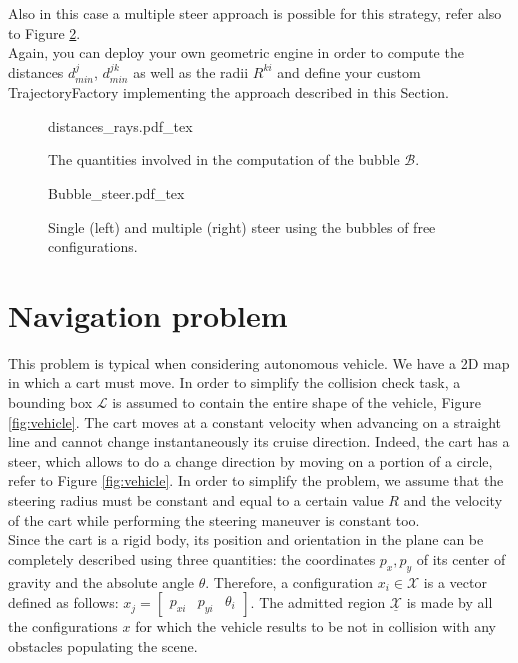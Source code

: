 Also in this case a multiple steer approach is possible for this strategy, refer also to Figure \ref{fig:bubbles}.
\\
Again, you can deploy your own geometric engine in order to compute the distances $d^j_{min}$, $d^{jk}_{min}$ as well as the radii $R^{ki}$ and define your custom TrajectoryFactory implementing the approach described in this Section.

 \begin{figure}
	 \centering
 \def\svgwidth{0.85 \columnwidth}
 {distances_rays.pdf_tex} 
	 \caption{The quantities involved in the computation of the bubble $\mathcal{B}$.}
 \label{fig:dist_ray}
 \end{figure}

 \begin{figure}
	 \centering
 \def\svgwidth{0.45 \columnwidth}
 {Bubble_steer.pdf_tex} 
	 \caption{Single (left) and multiple (right) steer using the bubbles of free configurations.}
 \label{fig:bubbles}
 \end{figure}

\section{Navigation problem}

This problem is typical when considering autonomous vehicle. We have a 2D map in which a cart must move. In order to simplify the collision check task, a bounding box $\mathcal{L}$ is assumed to contain the entire shape of the vehicle, Figure \ref{fig:vehicle}. The cart moves at a constant velocity when advancing on a straight line and cannot change instantaneously its cruise direction. Indeed, the cart has a steer, which allows to do a change direction by moving on a portion of a circle, refer to Figure \ref{fig:vehicle}. In order to simplify the problem, we assume that the steering radius must be constant and equal to a certain value $R$ and the velocity of the cart while performing the steering maneuver is constant too. 
\\
Since the cart is a rigid body, its position and orientation in the plane can be completely described using three quantities: the coordinates $p_x,p_y$ of its center of gravity and the absolute angle $\theta$. Therefore, a configuration $x_i \in \mathcal{X}$ is a vector defined as follows: $x_j = \begin{bmatrix} p_{xi} & p_{yi} & \theta _i  \end{bmatrix}$. The admitted region $\underline{\mathcal{X}}$  is made by all the configurations $x$ for which the vehicle results to be not in collision with any obstacles populating the scene.

